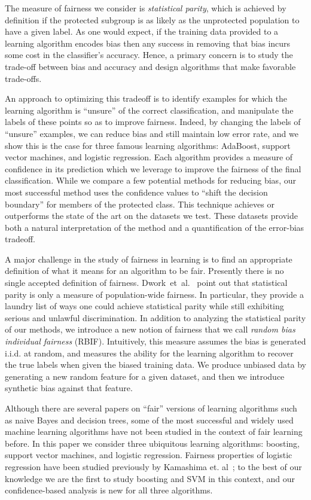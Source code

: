 \documentclass[conference]{IEEEtran}
\begin{document}
The measure of fairness we consider is \emph{statistical parity}, which is
achieved by definition if the protected subgroup is as likely as the
unprotected population to have a given label. As one would expect, if the
training data provided to a learning algorithm encodes bias then any success in
removing that bias incurs some cost in the classifier's accuracy. Hence, a
primary concern is to study the trade-off between bias and accuracy and design
algorithms that make favorable trade-offs. 

An approach to optimizing this tradeoff is to identify examples for which the
learning algorithm is ``unsure'' of the correct classification, and manipulate
the labels of these points so as to improve fairness. Indeed, by changing the
labels of ``unsure'' examples, we can reduce bias and still maintain low error
rate, and we show this is the case for three famous learning algorithms:
AdaBoost, support vector machines, and logistic regression. Each algorithm
provides a measure of confidence in its prediction which we leverage to improve
the fairness of the final classification. While we compare a few potential
methods for reducing bias, our most successful method uses the confidence
values to ``shift the decision boundary'' for members of the protected class.
This technique achieves or outperforms the state of the art on the datasets we
test.  These datasets provide both a natural interpretation of the method and a
quantification of the error-bias tradeoff.

A major challenge in the study of fairness in learning is to find an
appropriate definition of what it means for an algorithm to be fair.
Presently there is no single accepted definition of fairness.
Dwork~et~al.~\cite{DworkHPR12} point out that statistical parity is only a
measure of population-wide fairness. In particular, they provide a laundry list
of ways one could achieve statistical parity while still exhibiting serious and
unlawful discrimination.  In addition to analyzing the statistical parity of
our methods, we introduce a new notion of fairness that we call \emph{random
bias individual fairness} (RBIF). Intuitively, this measure assumes the bias is
generated i.i.d. at random, and measures the ability for the learning algorithm
to recover the true labels when given the biased training data. We produce
unbiased data by generating a new random feature for a given dataset, and then
we introduce synthetic bias against that feature.

Although there are several papers on ``fair'' versions of learning algorithms
such as naive Bayes and decision trees, some of the most successful and widely
used machine learning algorithms have not been studied in the context of fair
learning before. In this paper we consider three ubiquitous learning
algorithms: boosting, support vector machines, and logistic regression.
Fairness properties of logistic regression have been studied previously by
Kamashima et. al~\cite{KamashimaAS11}; to the best of our knowledge we are the
first to study boosting and SVM in this context, and our confidence-based
analysis is new for all three algorithms. 
\end{document}
